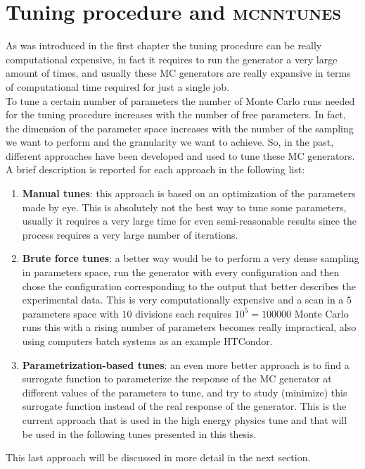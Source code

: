 \chapter{Tuning procedure and \textsc{mcnntunes}}
\label{chap:TuneprocedureCP5TuneandMCNNTUNES}


As was introduced in the first chapter the tuning procedure can be really computational expensive, in fact it requires to run the generator a very large amount of times, and usually these MC generators are really expansive in terms of computational time required for just a single job.  
\\
To tune a certain number of parameters the number of Monte Carlo runs needed for the tuning procedure increases with the number of free parameters. In fact, the dimension of the parameter space increases with the number of the sampling we want to perform and the granularity we want to achieve. So, in the past, different approaches have been developed and used to tune these MC generators. A brief description is reported for each approach in the following list:
\begin{enumerate}[label=\arabic*)]
	\item \textbf{Manual tunes}: this approach is based on an optimization of the parameters made by eye. This is absolutely not the best way to tune some parameters, usually it requires a very large time for even semi-reasonable results since the process requires a very large number of iterations.   
	\item \textbf{Brute force tunes}: a better way would be to perform a very dense sampling in parameters space, run the generator with every configuration and then chose the configuration corresponding to the output that better describes the experimental data. This is very computationally expensive and a scan in a $5$ parameters space with $10$ divisions each requires $10^5=100000$ Monte Carlo runs this with a rising number of parameters becomes really impractical, also using computers batch systems as an example HTCondor.   
	\item \textbf{Parametrization-based tunes}: an even more better approach is to find a surrogate function to parameterize the response of the MC generator at different values of the parameters to tune, and try to study (minimize) this surrogate function instead of the real response of the generator. This is the current approach that is used in the high energy physics tune and that will be used in the following tunes presented in this thesis.
\end{enumerate}
This last approach will be discussed in more detail in the next section.

